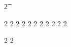 \DeclareTextCommandDefault{\t}
  {\CheckEncodingSubset{}2\t}



\DeclareTextCommandDefault{\capitalacute}       {\tc@check@accent{\'}2\capitalacute}
\DeclareTextCommandDefault{\capitalbreve}       {\tc@check@accent{\u}2\capitalbreve}
\DeclareTextCommandDefault{\capitalcaron}       {\tc@check@accent{\v}2\capitalcaron}
\DeclareTextCommandDefault{\capitalcircumflex}  {\tc@check@accent{\^}2\capitalcircumflex}
\DeclareTextCommandDefault{\capitaldieresis}    {\tc@check@accent{\"}2\capitaldieresis}
\DeclareTextCommandDefault{\capitaldotaccent}   {\tc@check@accent{\.}2\capitaldotaccent}
\DeclareTextCommandDefault{\capitalgrave}       {\tc@check@accent{\`}2\capitalgrave}
\DeclareTextCommandDefault{\capitalhungarumlaut}{\tc@check@accent{\H}2\capitalhungarumlaut}
\DeclareTextCommandDefault{\capitalmacron}      {\tc@check@accent{\=}2\capitalmacron}
\DeclareTextCommandDefault{\capitalring}        {\tc@check@accent{\r}2\capitalring}
\DeclareTextCommandDefault{\capitaltie}         {\tc@check@accent{\t}2\capitaltie}
\DeclareTextCommandDefault{\capitaltilde}       {\tc@check@accent{\~}2\capitaltilde}


\DeclareTextCommandDefault{\newtie}             {\tc@check@accent{\t}2\newtie}
\DeclareTextCommandDefault{\capitalnewtie}      {\tc@check@accent{\t}2\capitalnewtie}




\DeclareTextCommandDefault{\textlbrackdbl}      {\textlbrackdbl}
\DeclareTextCommandDefault{\textrbrackdbl}      {\textrbrackdbl}


\DeclareTextCommandDefault{\texteightoldstyle}  {\texteightoldstyle}
\DeclareTextCommandDefault{\textfiveoldstyle}   {\textfiveoldstyle}
\DeclareTextCommandDefault{\textfouroldstyle}   {\textfouroldstyle}
\DeclareTextCommandDefault{\textnineoldstyle}   {\textnineoldstyle}
\DeclareTextCommandDefault{\textoneoldstyle}    {\textoneoldstyle}
\DeclareTextCommandDefault{\textsevenoldstyle}  {\textsevenoldstyle}
\DeclareTextCommandDefault{\textsixoldstyle}    {\textsixoldstyle}
\DeclareTextCommandDefault{\textthreeoldstyle}  {\textthreeoldstyle}
\DeclareTextCommandDefault{\texttwooldstyle}    {\texttwooldstyle}
\DeclareTextCommandDefault{\textzerooldstyle}   {\textzerooldstyle}

